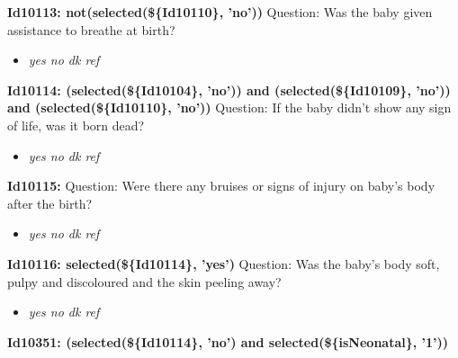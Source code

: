 \documentclass{article}%
\begin{document}
\textbf{Id10113: not(selected(\$\{Id10110\}, 'no'))\newline%
}%
Question: Was the baby given assistance to breathe at birth?\newline%
%
\begin{itemize}%
\item%
\textit{yes\newline%
 no\newline%
 dk\newline%
 ref\newline%
}%
\end{itemize}%
\textbf{Id10114: (selected(\$\{Id10104\}, 'no')) and (selected(\$\{Id10109\}, 'no')) and (selected(\$\{Id10110\}, 'no'))\newline%
}%
Question: If the baby didn't show any sign of life, was it born dead?\newline%
%
\begin{itemize}%
\item%
\textit{yes\newline%
 no\newline%
 dk\newline%
 ref\newline%
}%
\end{itemize}%
\textbf{Id10115: \newline%
}%
Question: Were there any bruises or signs of injury on baby's body after the birth?\newline%
%
\begin{itemize}%
\item%
\textit{yes\newline%
 no\newline%
 dk\newline%
 ref\newline%
}%
\end{itemize}%
\textbf{Id10116: selected(\$\{Id10114\}, 'yes')\newline%
}%
Question: Was the baby’s body soft, pulpy and discoloured and the skin peeling away?\newline%
%
\begin{itemize}%
\item%
\textit{yes\newline%
 no\newline%
 dk\newline%
 ref\newline%
}%
\end{itemize}%
\textbf{Id10351: (selected(\$\{Id10114\}, 'no') and selected(\$\{isNeonatal\}, '1'))\newline%
}%
\end{document}
